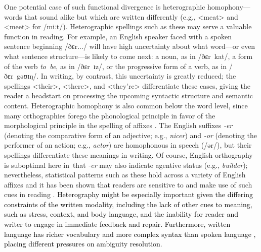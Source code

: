 \documentclass[doc,biblatex]{apa7}
\newcommand\firstrevision[1]{\textcolor{black}{#1}}
\begin{document}
One potential case of such functional divergence is heterographic homophony---words that sound alike but which are written differently (e.g., <meat> and <meet> for /miːt/). Heterographic spellings such as these may serve a valuable function in reading. For example, an English speaker faced with a spoken sentence beginning /ðɛr.../ will have high uncertainty about what word---or even what sentence structure---is likely to come next: a noun, as in /ðɛr~kat/, a form of the verb \textit{to~be}, as in /ðɛr~ɪz/, or the progressive form of a verb, as in /ðɛr~gəʊɪŋ/. In writing, by contrast, this uncertainty is greatly reduced; the spellings <their>, <there>, and <they're> differentiate these cases, giving the reader a headstart on processing the upcoming syntactic structure and semantic content. Heterographic homophony is also common below the word level, since many orthographies forego the phonological principle in favor of the morphological principle in the spelling of affixes \parencite{Sandra:2024}. The English suffixes \textit{-er} (denoting the comparative form of an adjective; e.g., \textit{nicer}) and \textit{-or} (denoting the performer of an action; e.g., \textit{actor}) are homophonous in speech (/ər/), but their spellings differentiate these meanings in writing. Of course, English orthography is suboptimal here in~that \textit{-er} may also indicate agentive status (e.g., \textit{builder}); nevertheless, statistical patterns such as these hold across a variety of English affixes \parencite{Berg:2017} and it has been shown that readers are sensitive to and make use of such cues in reading \parencite{Ulicheva:2020}. \firstrevision{Heterography might be especially important given the differing constraints of the written modality, including the lack of other cues to meaning, such as stress, context, and body language, and the inability for reader and writer to engage in immediate feedback and repair. Furthermore, written language has richer vocabulary and more complex syntax than spoken language \parencite{Biber:1988, Korochkina:2024, Nation:2022}, placing different pressures on ambiguity resolution.}
\end{document}

